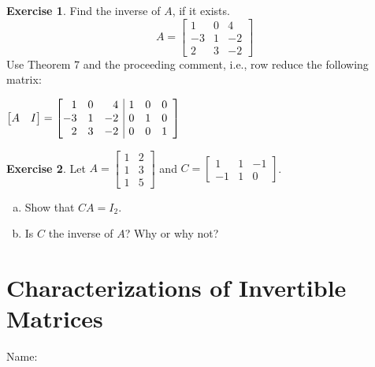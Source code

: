 \documentclass[10pt]{book}
\makeatletter
\theoremstyle{definition}
\newtheorem{exercise}{Exercise}[section]
\newenvironment{amatrix}[2]{%
	\left[\begin{array}{@{}*{#1}{r}|@{\hskip 1ex}@{}*{#2}{r}}
	}{%
\end{array}\right]
}
\newcommand{\name}[1][2.5in]{\vspace{-2.3em}\hfill Name: \underline{\hspace{#1}}}
\makeatother
\begin{document}
\begin{exercise} %
	Find the inverse of $A$, if it exists.
	$$ A = \begin{bmatrix}1&0&4\\-3&1&-2\\2&3&-2\end{bmatrix} $$
	Use Theorem 7 and the proceeding comment, i.e., row reduce the following matrix:\par
	\vspace{1em}
	$\begin{bmatrix}A&I\end{bmatrix} = 
	\begin{amatrix}{3}{3}
		1&0&4&1&0&0\\
		-3&1&-2&0&1&0\\
		2&3&-2&0&0&1
	\end{amatrix}$
\end{exercise}
\vfill


\begin{exercise} %
	Let $A=\begin{bmatrix}1&2\\1&3\\1&5\end{bmatrix}$ and $C=\begin{bmatrix}1&1&-1\\-1&1&0\end{bmatrix}$.
	\begin{enumerate}[(a)]
		\item Show that $CA=I_2$.
		\vfill
		\item Is $C$ the inverse of $A$? Why or why not?
		\vspace{2em}
	\end{enumerate}
\end{exercise}


\newpage


\section{Characterizations of Invertible Matrices}
\name[1.5in]
\end{document}
